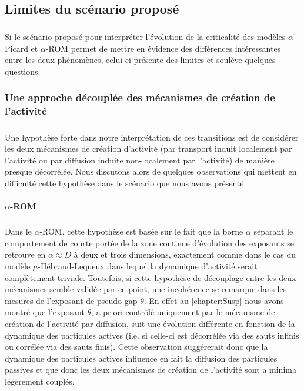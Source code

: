 \subsection{Limites du scénario proposé}

\subparagraph{}Si le scénario proposé pour interpréter l'évolution de la criticalité des modèles $\alpha$-Picard et $\alpha$-ROM permet de mettre en évidence des différences intéressantes entre les deux phénomènes, celui-ci présente des limites et soulève quelques questions.

\subsubsection{Une approche découplée des mécanismes de création de l'activité}

\subparagraph{}Une hypothèse forte dans notre interprétation de ces transitions est de considérer les deux mécanismes de création d'activité (par transport induit localement par l'activité ou par diffusion induite non-localement par l'activité) de manière presque décorrélée. Nous discutons alors de quelques observations qui mettent en difficulté cette hypothèse dans le scénario que nous avons présenté.

\paragraph{$\alpha$-ROM}

\subparagraph{}Dans le $\alpha$-ROM, cette hypothèse est basée sur le fait que la borne $\alpha$ séparant le comportement de courte portée de la zone continue d'évolution des exposants se retrouve en $\alpha \approx D$ à deux et trois dimensions, exactement comme dans le cas du modèle $\mu$-Hébraud-Lequeux dans lequel la dynamique d'activité serait complètement triviale. Toutefois, si cette hypothèse de découplage entre les deux mécanismes semble validée par ce point, une incohérence se remarque dans les mesures de l'exposant de pseudo-gap $\theta$. En effet au \autoref{chapter:Susp} nous avons montré que l'exposant $\theta$, a priori contrôlé uniquement par le mécanisme de création de l'activité par diffusion, suit une évolution différente en fonction de la dynamique des particules actives (i.e. si celle-ci est décorrélée via des sauts infinis ou corrélée via des sauts finis). Cette observation suggérerait donc que la dynamique des particules actives influence en fait la diffusion des particules passives et que donc les deux mécanismes de création de l'activité sont a minima légèrement couplés. 

